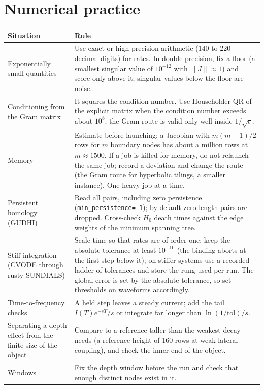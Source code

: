 \documentclass[11pt,a4paper]{article}
\begin{document}
\section{Numerical practice}
\begin{center}\small\begin{tabular}{p{4.0cm}p{9.8cm}}\toprule
Situation & Rule \\ \midrule
Exponentially small quantities & Use exact or high-precision arithmetic (140 to 220 decimal digits) for rates. In double precision, fix a floor (a smallest singular value of $10^{-12}$ with $\|J\|\approx1$) and score only above it; singular values below the floor are noise. \\
Conditioning from the Gram matrix & It squares the condition number. Use Householder QR of the explicit matrix when the condition number exceeds about $10^{8}$; the Gram route is valid only well inside $1/\sqrt{\epsilon}$. \\
Memory & Estimate before launching: a Jacobian with $m(m-1)/2$ rows for $m$ boundary nodes has about a million rows at $m\approx1500$. If a job is killed for memory, do not relaunch the same job; record a deviation and change the route (the Gram route for hyperbolic tilings, a smaller instance). One heavy job at a time. \\
Persistent homology (GUDHI) & Read all pairs, including zero persistence (\texttt{min\_persistence=-1}); by default zero-length pairs are dropped. Cross-check $H_0$ death times against the edge weights of the minimum spanning tree. \\
Stiff integration (CVODE through rusty-SUNDIALS) & Scale time so that rates are of order one; keep the absolute tolerance at least $10^{-10}$ (the binding aborts at the first step below it); on stiffer systems use a recorded ladder of tolerances and store the rung used per run. The global error is set by the absolute tolerance, so set thresholds on waveforms accordingly. \\
Time-to-frequency checks & A held step leaves a steady current; add the tail $I(T)e^{-sT}/s$ or integrate far longer than $\ln(1/\text{tol})/s$. \\
Separating a depth effect from the finite size of the object & Compare to a reference taller than the weakest decay needs (a reference height of 160 rows at weak lateral coupling), and check the inner end of the object. \\
Windows & Fix the depth window before the run and check that enough distinct nodes exist in it. \\ \bottomrule
\end{tabular}\end{center}
\end{document}
